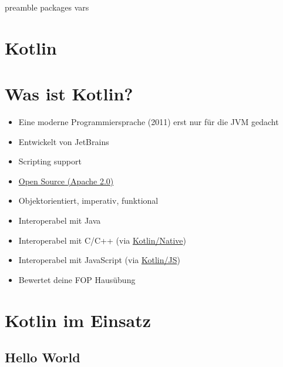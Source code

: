 \RequirePackage{import}
{preamble}
{packages}
{vars}


    \section{Kotlin}\label{sec:kotlin}
    \begin{frame}[c]
        \centering
        \Large
        
        \linebreak
    \end{frame}


    \section{Was ist Kotlin?}\label{sec:was-ist-kotlin?}
    \begin{frame}
        \slidehead
        \begin{itemize}[<+->]
            \item Eine moderne Programmiersprache (2011) erst nur für die JVM gedacht
            \item Entwickelt von JetBrains
            \item Scripting support
            \item \href{https://github.com/JetBrains/kotlin}{Open Source (Apache 2.0)}
            \item Objektorientiert, imperativ, funktional
            \item Interoperabel mit Java
            \item Interoperabel mit C/C++ (via \href{https://kotlinlang.org/docs/native-overview.html}{Kotlin/Native})
            \item Interoperabel mit JavaScript (via \href{https://kotlinlang.org/docs/js-overview.html}{Kotlin/JS})
            \item Bewertet deine FOP Hausübung
        \end{itemize}
    \end{frame}


    \section{Kotlin im Einsatz}\label{sec:kotlin-im-einsatz}

    \subsection{Hello World}\label{subsec:hello-world}
    \begin{frame}
        \slidehead
    \end{frame}

